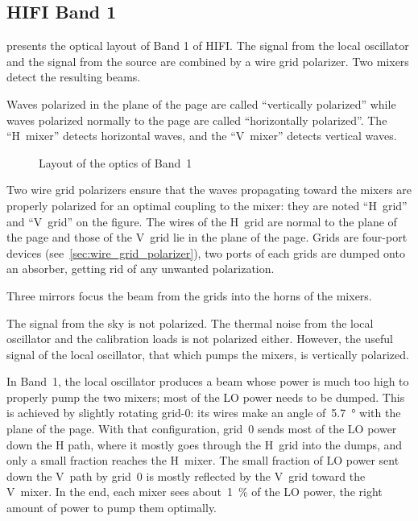 \begin{refsection}
\section{HIFI Band 1}
 presents the optical layout of Band 1 of HIFI.
The signal from the local oscillator and the signal from the source are combined by a wire grid polarizer.
Two mixers detect the resulting beams.

Waves polarized in the plane of the page are called ``vertically polarized'' while waves polarized normally to the page are called ``horizontally polarized''.
The ``H~mixer'' detects horizontal waves, and the ``V~mixer'' detects vertical waves.

\begin{figure}
    \centering
    \footnotesize
    
    \caption{Layout of the optics of Band~1}
    \label{fig:band1_layout}
\end{figure}

Two wire grid polarizers ensure that the waves propagating toward the mixers are properly polarized for an optimal coupling to the mixer: they are noted ``H~grid'' and ``V~grid'' on the figure.
The wires of the H~grid are normal to the plane of the page and those of the V~grid lie in the plane of the page.
Grids are four-port devices (see~\cref{sec:wire_grid_polarizer}), two ports of each grids are dumped onto an absorber, getting rid of any unwanted polarization.

Three mirrors focus the beam from the grids into the horns of the mixers.

The signal from the sky is not polarized.
The thermal noise from the local oscillator and the calibration loads is not polarized either.
However, the useful signal of the local oscillator, that which pumps the mixers, is vertically polarized.

In Band~1, the local oscillator produces a beam whose power is much too high to properly pump the two mixers; most of the LO power needs to be dumped.
This is achieved by slightly rotating grid-0: its wires make an angle of~\SI{5.7}{\degree} with the plane of the page.
With that configuration, grid~0 sends most of the LO power down the H path, where it mostly goes through the H~grid into the dumps, and only a small fraction reaches the H~mixer.
The small fraction of LO power sent down the V~path by grid~0 is mostly reflected by the V~grid toward the V~mixer.
In the end, each mixer sees about~\SI{1}{\percent} of the LO power, the right amount of power to pump them optimally.


\end{refsection}
